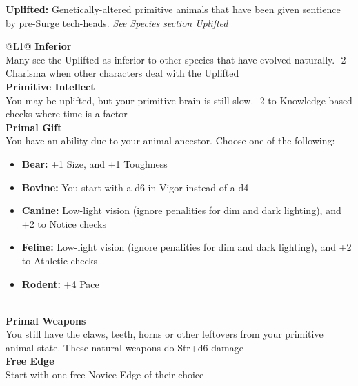 \begin{enumerate}
  \textbf{Uplifted:} Genetically-altered primitive animals that have been given sentience by pre-Surge tech-heads. \textit{\hyperref[sec:specie-uplifted]{See Species section Uplifted}}
  \begin{redtable}{\linewidth}{@{}L{1}@{}}
    \textbf{Inferior}\\
    Many see the Uplifted as inferior to other species that have evolved naturally. -2 Charisma when other characters deal with the Uplifted\\
    \textbf{Primitive Intellect}\\
    You may be uplifted, but your primitive brain is still slow. -2 to Knowledge-based checks where time is a factor\\
    \textbf{Primal Gift}\\
    You have an ability due to your animal ancestor. Choose one of the following:
      \begin{itemize}
        \item \textbf{Bear:} +1 Size, and +1 Toughness
        \item \textbf{Bovine:} You start with a d6 in Vigor instead of a d4
        \item \textbf{Canine:} Low-light vision (ignore penalities for dim and dark lighting), and +2 to Notice checks
        \item \textbf{Feline:} Low-light vision (ignore penalities for dim and dark lighting), and +2 to Athletic checks
        \item \textbf{Rodent:} +4 Pace
      \end{itemize}\\
    \textbf{Primal Weapons}\\
    You still have the claws, teeth, horns or other leftovers from your primitive animal state. These natural weapons do Str+d6 damage\\
    \textbf{Free Edge}\\
    Start with one free Novice Edge of their choice\\
  \end{redtable}
  
  \hline


\end{enumerate}
